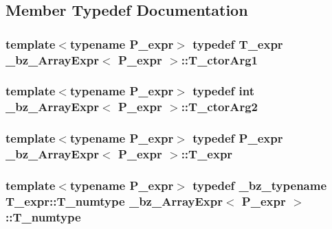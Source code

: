 \subsection{Member Typedef Documentation}
\hypertarget{class__bz__ArrayExpr_a417e9cdc832f5a33d48bc504ce4ce6f5}{}
\subsubsection[{T\+\_\+ctor\+Arg1}]{\setlength{\rightskip}{0pt plus 5cm}template$<$typename P\+\_\+expr$>$ typedef {\bf T\+\_\+expr} {\bf \+\_\+bz\+\_\+\+Array\+Expr}$<$ P\+\_\+expr $>$\+::{\bf T\+\_\+ctor\+Arg1}}\label{class__bz__ArrayExpr_a417e9cdc832f5a33d48bc504ce4ce6f5}
\hypertarget{class__bz__ArrayExpr_a8b947078f5ab5273f0b36bca3129c3e3}{}
\subsubsection[{T\+\_\+ctor\+Arg2}]{\setlength{\rightskip}{0pt plus 5cm}template$<$typename P\+\_\+expr$>$ typedef int {\bf \+\_\+bz\+\_\+\+Array\+Expr}$<$ P\+\_\+expr $>$\+::{\bf T\+\_\+ctor\+Arg2}}\label{class__bz__ArrayExpr_a8b947078f5ab5273f0b36bca3129c3e3}
\hypertarget{class__bz__ArrayExpr_a1675ef17c504a89b9bc1e8ddf4e875c2}{}
\subsubsection[{T\+\_\+expr}]{\setlength{\rightskip}{0pt plus 5cm}template$<$typename P\+\_\+expr$>$ typedef P\+\_\+expr {\bf \+\_\+bz\+\_\+\+Array\+Expr}$<$ P\+\_\+expr $>$\+::{\bf T\+\_\+expr}}\label{class__bz__ArrayExpr_a1675ef17c504a89b9bc1e8ddf4e875c2}
\hypertarget{class__bz__ArrayExpr_afa1ec55de102cafbc549da90093af10b}{}
\subsubsection[{T\+\_\+numtype}]{\setlength{\rightskip}{0pt plus 5cm}template$<$typename P\+\_\+expr$>$ typedef {\bf \+\_\+bz\+\_\+typename} T\+\_\+expr\+::\+T\+\_\+numtype {\bf \+\_\+bz\+\_\+\+Array\+Expr}$<$ P\+\_\+expr $>$\+::{\bf T\+\_\+numtype}}\label{class__bz__ArrayExpr_afa1ec55de102cafbc549da90093af10b}


